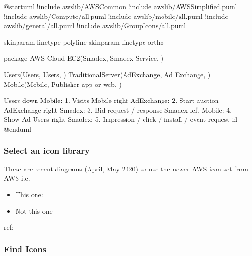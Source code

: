 \documentclass[letterpaper,10pt,english]{sphinxmanual}
\begin{document}
\begin{sphinxVerbatim}[commandchars=\\\{\},numbers=left,firstnumber=1,stepnumber=1]
@startuml
!include \PYGZlt{}awslib/AWSCommon\PYGZgt{}
!include \PYGZlt{}awslib/AWSSimplified.puml\PYGZgt{}
!include \PYGZlt{}awslib/Compute/all.puml\PYGZgt{}
!include \PYGZlt{}awslib/mobile/all.puml\PYGZgt{}
!include \PYGZlt{}awslib/general/all.puml\PYGZgt{}
!include \PYGZlt{}awslib/GroupIcons/all.puml\PYGZgt{}

 skinparam linetype polyline
\PYGZsq{} skinparam linetype ortho

package \PYGZdq{}AWS Cloud\PYGZdq{} \PYGZob{}
EC2(Smadex, \PYGZdq{}Smadex Service\PYGZdq{}, \PYGZdq{} \PYGZdq{})
\PYGZcb{}

Users(Users, \PYGZdq{}Users\PYGZdq{}, \PYGZdq{} \PYGZdq{})
TraditionalServer(AdExchange, \PYGZdq{}Ad Exchange\PYGZdq{}, \PYGZdq{} \PYGZdq{})
Mobile(Mobile, \PYGZdq{}Publisher app or web\PYGZdq{}, \PYGZdq{} \PYGZdq{})

Users \PYGZhy{}down\PYGZhy{}\PYGZgt{} Mobile: 1. Visits
Mobile \PYGZhy{}right\PYGZhy{}\PYGZgt{} AdExchange: 2. Start auction
AdExchange \PYGZhy{}right\PYGZhy{}\PYGZgt{} Smadex: 3. Bid request / response
Smadex \PYGZhy{}left\PYGZhy{}\PYGZgt{} Mobile: 4. Show Ad
Users \PYGZhy{}right\PYGZhy{}\PYGZgt{} Smadex: 5. Impression / click / install / event \PYGZob{}request id\PYGZcb{}
@enduml
\end{sphinxVerbatim}


\subsubsection{Select an icon library}
\label{\detokenize{aws/aws:select-an-icon-library}}
These are recent diagrams (April, May 2020) so use the newer AWS icon set from AWS i.e.
\begin{itemize}
\item {} 
This one: 

\item {} 
Not this one 

\end{itemize}

ref: 


\subsubsection{Find Icons}
\label{\detokenize{aws/aws:find-icons}}
\begin{figure}[htbp]
\centering

\end{figure}
\end{document}
